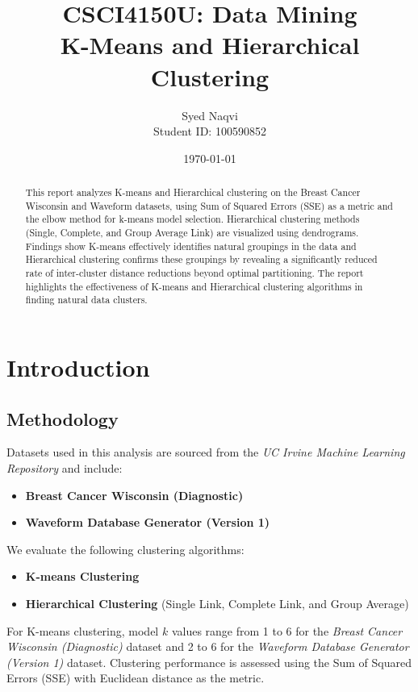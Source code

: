 \documentclass{article}
\title{\textbf{CSCI4150U: Data Mining}\\K-Means and Hierarchical Clustering}
\author{Syed Naqvi \\ Student ID: 100590852}
\date{\today}
\begin{document}
\maketitle

\begin{abstract}
This report analyzes K-means and Hierarchical clustering on the Breast Cancer Wisconsin and Waveform datasets, using Sum of Squared Errors
(SSE) as a metric and the elbow method for k-means model selection. Hierarchical clustering methods (Single, Complete, and Group Average
Link) are visualized using dendrograms. Findings show K-means effectively identifies natural groupings in the data and Hierarchical
clustering confirms these groupings by revealing a significantly reduced rate of inter-cluster distance reductions beyond optimal
partitioning. The report highlights the effectiveness of K-means and Hierarchical clustering algorithms in finding natural data clusters.
\end{abstract}
    
    

\section{Introduction}

\subsection{Methodology}
Datasets used in this analysis are sourced from the \textit{UC Irvine Machine Learning Repository} and include:
\begin{itemize}
    \item \textbf{Breast Cancer Wisconsin (Diagnostic)}
    \item \textbf{Waveform Database Generator (Version 1)}
\end{itemize}

We evaluate the following clustering algorithms:
\begin{itemize}
    \item \textbf{K-means Clustering}
    \item \textbf{Hierarchical Clustering} (Single Link, Complete Link, and Group Average)
\end{itemize}

For K-means clustering, model \( k \) values range from 1 to 6 for the \textit{Breast Cancer Wisconsin (Diagnostic)} dataset
and 2 to 6 for the \textit{Waveform Database Generator (Version 1)} dataset. Clustering performance is assessed using the Sum of Squared Errors
(SSE) with Euclidean distance as the metric.
\end{document}
